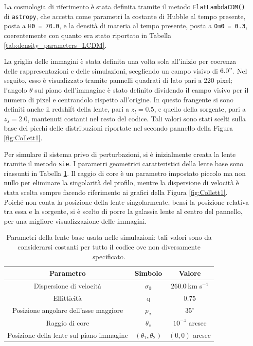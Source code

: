 La cosmologia di riferimento è stata definita tramite il metodo \texttt{FlatLambdaCDM()} di \texttt{astropy}, che accetta come parametri la costante di Hubble al tempo presente, posta a \texttt{H0 = 70.0}, e la densità di materia al tempo presente, posta a \texttt{Om0 = 0.3}, coerentemente con quanto era stato riportato in Tabella \ref{tab:density_parameters_LCDM}.

La griglia delle immagini è stata definita una volta sola all'inizio per coerenza delle rappresentazioni e delle simulazioni, scegliendo un campo visivo di $6.0"$. Nel seguito, esso è visualizzato tramite pannelli quadrati di lato pari a 220 pixel; l'angolo $\theta$ sul piano dell'immagine è stato definito dividendo il campo visivo per il numero di pixel e centrandolo rispetto all'origine. In questo frangente si sono definiti anche il redshift della lente, pari a $z_l=0.5$, e quello della sorgente, pari a $z_s = 2.0$, mantenuti costanti nel resto del codice. Tali valori sono stati scelti sulla base dei picchi delle distribuzioni riportate nel secondo pannello della Figura \ref{fig:Collett1}.

Per simulare il sistema privo di perturbazioni, si è inizialmente creata la lente tramite il metodo \texttt{sie}.
I parametri geometrici caratteristici della lente base sono riassunti in Tabella \ref{tab:lens_par_sim}. Il raggio di core è un parametro impostato piccolo ma non nullo per eliminare la singolarità del profilo, mentre la dispersione di velocità è stata scelta sempre facendo riferimento ai grafici della Figura \ref{fig:Collett1}. Poiché non conta la posizione della lente singolarmente, bensì la posizione relativa tra essa e la sorgente, si è scelto di porre la galassia lente al centro del pannello, per una migliore visualizzazione delle immagini.

\begin{table}[]
\centering
\begin{tabular}{|c|c|c|}
\hline
\textbf{Parametro}                    & \textbf{Simbolo}   & \textbf{Valore}     \\ \hline
Dispersione di velocità               & $\sigma_0$ & $260.0\ $km s$^{-1}$ \\ \hline
Ellitticità                           & q                  & 0.75                \\ \hline
Posizione angolare dell'asse maggiore & $p_a$              & $35^\circ$        \\ \hline
Raggio di core                        & $\theta_c$         & $10^{-4}$ arcsec    \\ \hline
Posizione della lente sul piano immagine                & $(\theta_1, \theta_2)$       & $(0,0)$ arcsec             \\ \hline
\end{tabular}
\caption{Parametri della lente base usata nelle simulazioni; tali valori sono da considerarsi costanti per tutto il codice ove non diversamente specificato.}
\label{tab:lens_par_sim}
\end{table}

